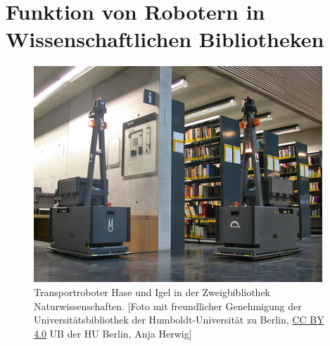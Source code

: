 \documentclass[a4paper,
fontsize=11pt,
oneside,
numbers=noperiodatend,
parskip=half-,
bibliography=totoc,
final
]{scrartcl}
\begin{document}
\hypertarget{funktion-von-robotern-in-wissenschaftlichen-bibliotheken}{%
\section{Funktion von Robotern in Wissenschaftlichen
Bibliotheken}\label{funktion-von-robotern-in-wissenschaftlichen-bibliotheken}}

\begin{figure}
\centering
\includegraphics[width=.7\textwidth]{img/HaseIgel.png}
\caption{Transportroboter Hase und Igel in der Zweigbibliothek
Naturwissenschaften. {[}Foto mit freundlicher Genehmigung der
Universitätsbibliothek der Humboldt-Universität zu Berlin, \href{https://creativecommons.org/licenses/by/4.0/}{CC BY 4.0} UB der
HU Berlin, Anja Herwig{]}}
\end{figure}
\end{document}
